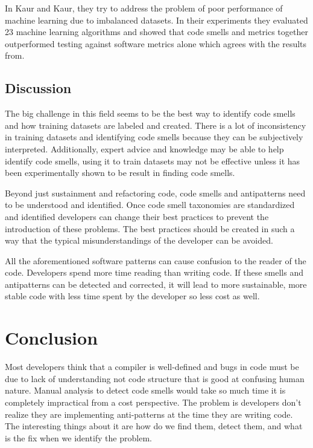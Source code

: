 \documentclass[conference]{IEEEtran}
\begin{document}
In Kaur and Kaur\cite{kaur_evaluation_2017}, they try to address the problem of poor performance of machine learning due to imbalanced datasets. 
In their experiments they evaluated 23 machine learning algorithms  and showed that code smells and metrics together outperformed testing against software metrics alone which agrees with the results from\cite{chernis_machine_2018}.
\subsection{Discussion}
The big challenge in this field seems to be the best way to identify code smells and how training datasets are labeled and created.
There is a lot of inconsistency in training datasets and identifying code smells because they can be subjectively interpreted.
Additionally, expert advice and knowledge may be able to help identify code smells, using it to train datasets may not be effective unless it has been experimentally shown to be result in finding code smells. 

Beyond just sustainment and refactoring code, code smells and antipatterns need to be understood and identified.
Once code smell taxonomies are standardized and identified developers can change their best practices to prevent the introduction of these problems.
The best practices should be created in such a way that the typical misunderstandings of the developer can be avoided.

All the aforementioned software patterns can cause confusion to the reader of the code. Developers spend more time reading than writing code. If these smells and antipatterns can be detected and corrected, it will lead to more sustainable, more stable code with less time spent by the developer so less cost as well.

\section{Conclusion}
Most developers think that a compiler is well-defined and bugs in code must be due to lack of understanding not code structure that is good at confusing human nature.
Manual analysis to detect code smells would take so much time it is completely impractical from a cost perspective.
The problem is developers don't realize they are implementing anti-patterns at the time they are writing code.
The interesting things about it are how do we find them, detect them, and what is the fix when we identify the problem.
\end{document}
